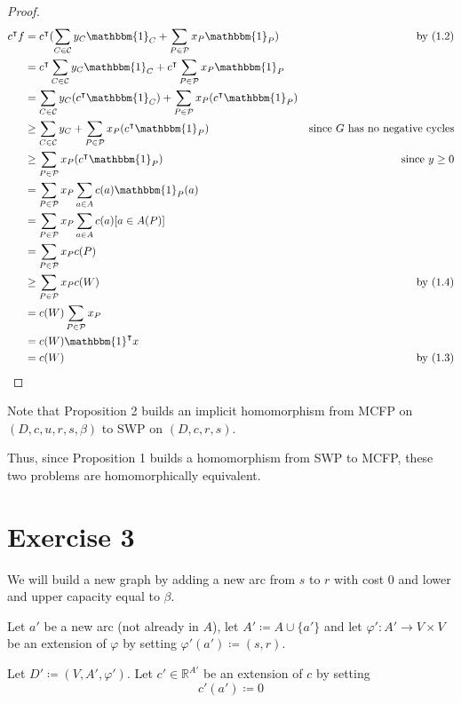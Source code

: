 \documentclass[a4paper,10pt, leqno]{article}
\theoremstyle{definition}
\begin{document}
\begin{proof}
\begin{align*}
  c^{\intercal}f &= c^{\intercal}(\sum_{C \in \mathcal{C}}{y_C \mathbbm{1}_C} + \sum_{P \in \mathcal{P}}{x_P \mathbbm{1}_P}) &\text{ by (1.2)}\\
  &= c^{\intercal}\sum_{C \in \mathcal{C}}{y_C \mathbbm{1}_C} + c^{\intercal}\sum_{P \in \mathcal{P}}{x_P \mathbbm{1}_P} \\
  &= \sum_{C \in \mathcal{C}}{y_C (c^{\intercal} \mathbbm{1}_C)} + \sum_{P \in \mathcal{P}}{x_P (c^{\intercal}\mathbbm{1}_P)} \\
  &\geq \sum_{C \in \mathcal{C}}{y_C} + \sum_{P \in \mathcal{P}}{x_P (c^{\intercal}\mathbbm{1}_P)} &\text{since $G$ has no negative cycles}\\
  &\geq \sum_{P \in \mathcal{P}}{x_P (c^{\intercal}\mathbbm{1}_P)} &\text{since }y \geq 0\\
  &= \sum_{P \in \mathcal{P}}{x_P \sum_{a \in A}{c(a)\mathbbm{1}_P(a)}} \\
  &= \sum_{P \in \mathcal{P}}{x_P \sum_{a \in A}{c(a)[a \in A(P)]}} \\
  &= \sum_{P \in \mathcal{P}}{x_P c(P)} \\
  &\geq \sum_{P \in \mathcal{P}}{x_P c(W)} &\text{ by (1.4)} \\
  &=  c(W)\sum_{P \in \mathcal{P}}{x_P} \\
  &=  c(W)\mathbbm{1}^{\intercal}x \\
  &=  c(W) &\text{ by (1.3)}
\end{align*}
\end{proof}

Note that Proposition 2 builds an implicit homomorphism from MCFP on $(D, c, u, r, s, \beta)$ to SWP on $(D, c, r, s)$. 

Thus, since Proposition 1 builds a homomorphism from SWP to MCFP, these two problems are homomorphically equivalent.


\section*{Exercise 3}

We will build a new graph by adding a new arc from $s$ to $r$ with cost $0$ and lower and upper capacity equal to $\beta$.

Let $a'$ be a new arc (not already in $A$), let $A' \coloneqq A \cup \{a'\}$ and let $\varphi' : A' \to V \times V$ be an extension of $\varphi$ by setting $\varphi'(a') \coloneqq (s, r)$.

Let $D' \coloneqq (V, A', \varphi')$. Let $c' \in \mathbb{R}^{A'}$ be an extension of $c$ by setting 
\begin{equation*}
    \tag{3.1} c'(a') \coloneqq 0 
\end{equation*}
\end{document}

